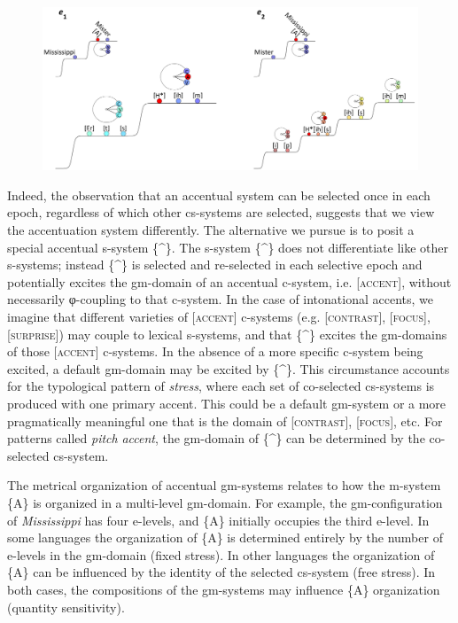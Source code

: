   
\begin{figure}
\includegraphics[width=\textwidth]{figures/Tilsen-img63.png}
\caption{\missingcaption}
\label{fig:}
\end{figure}
 

  Indeed, the observation that an accentual system can be selected once in each epoch, regardless of which other cs-systems are selected, suggests that we view the accentuation system differently. The alternative we pursue is to posit a special accentual s-system \{\^{}\}. The s-system \{\^{}\} does not differentiate like other s-systems; instead \{\^{}\} is selected and re-selected in each selective epoch and potentially excites the gm-domain of an accentual c-system, i.e. [\textsc{accent}], without necessarily φ-coupling to that c-system. In the case of intonational accents, we imagine that different varieties of [\textsc{accent}] c-systems (e.g. [\textsc{contrast}], [\textsc{focus}], [\textsc{surprise}]) may couple to lexical s-systems, and that \{\^{}\} excites the gm-domains of those [\textsc{accent}] c-systems. In the absence of a more specific c-system being excited, a default gm-domain may be excited by \{\^{}\}. This circumstance accounts for the typological pattern of \textit{stress}, where each set of co-selected cs-systems is produced with one primary accent. This could be a default gm-system or a more pragmatically meaningful one that is the domain of [\textsc{contrast}], [\textsc{focus}], etc. For patterns called \textit{pitch} \textit{accent}, the gm-domain of \{\^{}\} can be determined by the co-selected cs-system.

  The metrical organization of accentual gm-systems relates to how the m-system \{A\} is organized in a multi-level gm-domain. For example, the gm-configuration of \textit{Mississippi} has four e-levels, and \{A\} initially occupies the third e-level. In some languages the organization of \{A\} is determined entirely by the number of e-levels in the gm-domain (fixed stress). In other languages the organization of \{A\} can be influenced by the identity of the selected cs-system (free stress). In both cases, the compositions of the gm-systems may influence \{A\} organization (quantity sensitivity). 

